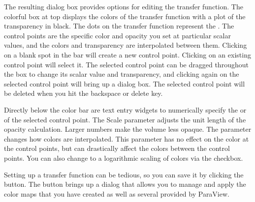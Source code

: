 The resulting dialog box provides options for editing the transfer
function.  The colorful box at top displays the colors of the transfer
function with a plot of the transparency in black.  The dots on the
transfer function represent the .  The control
points are the specific color and opacity you set at particular scalar
values, and the colors and transparency are interpolated between them.
Clicking on a blank spot in the bar will create a new control point.
Clicking on an existing control point will select it.  The selected control
point can be dragged throughout the box to change its scalar value and
transparency, and clicking again on the selected control point will bring
up a dialog box.  The selected control point will be deleted when you hit
the backspace or delete key.

Directly below the color bar are text entry widgets to numerically specify
the  or  of the selected control point.  The
Scale parameter adjusts the unit length of the opacity calculation.  Larger
numbers make the volume less opaque.  The  parameter
changes how colors are interpolated.  This parameter has no effect on the
color at the control points, but can drastically affect the colors between
the control points.  You can also change to a logarithmic scaling of colors
via the  checkbox.

Setting up a transfer function can be tedious, so you can save it by
clicking the  button.  The
 button brings up a
dialog that allows you to manage and apply the color maps that you have
created as well as several provided by ParaView.

